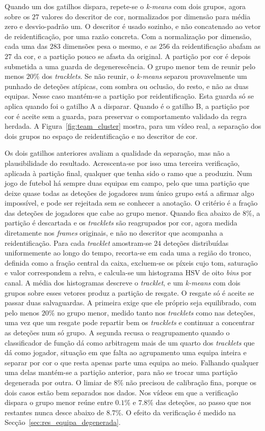 Quando um dos gatilhos dispara, repete-se o \emph{k-means} com dois grupos, agora sobre os $27$ valores do descritor de cor, normalizados por dimensão para média zero e desvio-padrão um. O descritor é usado sozinho, e não concatenado ao vetor de reidentificação, por uma razão concreta. Com a normalização por dimensão, cada uma das $283$ dimensões pesa o mesmo, e as $256$ da reidentificação abafam as $27$ da cor, e a partição pouco se afasta da original. A partição por cor é depois submetida a uma guarda de degenerescência. O grupo menor tem de reunir pelo menos $20\%$ dos \emph{tracklets}. Se não reunir, o \emph{k-means} separou provavelmente um punhado de deteções atípicas, com sombra ou oclusão, do resto, e não as duas equipas. Nesse caso mantém-se a partição por reidentificação. Esta guarda só se aplica quando foi o gatilho A a disparar. Quando é o gatilho B, a partição por cor é aceite sem a guarda, para preservar o comportamento validado da regra herdada. A Figura~\ref{fig:team_cluster} mostra, para um vídeo real, a separação dos dois grupos no espaço de reidentificação e no descritor de cor.

Os dois gatilhos anteriores avaliam a qualidade da separação, mas não a plausibilidade do resultado. Acrescenta-se por isso uma terceira verificação, aplicada à partição final, qualquer que tenha sido o ramo que a produziu. Num jogo de futebol há sempre duas equipas em campo, pelo que uma partição que deixe quase todas as deteções de jogadores num único grupo está a afirmar algo impossível, e pode ser rejeitada sem se conhecer a anotação. O critério é a fração das deteções de jogadores que cabe ao grupo menor. Quando fica abaixo de $8\%$, a partição é descartada e os \emph{tracklets} são reagrupados por cor, agora medida diretamente nos \emph{frames} originais, e não no descritor que acompanha a reidentificação. Para cada \emph{tracklet} amostram-se $24$ deteções distribuídas uniformemente ao longo do tempo, recorta-se em cada uma a região do tronco, definida como a fração central da caixa, excluem-se os píxeis cujo tom, saturação e valor correspondem a relva, e calcula-se um histograma HSV de oito \emph{bins} por canal. A média dos histogramas descreve o \emph{tracklet}, e um \emph{k-means} com dois grupos sobre esses vetores produz a partição de resgate. O resgate só é aceite se passar duas salvaguardas. A primeira exige que ele próprio seja equilibrado, com pelo menos $20\%$ no grupo menor, medido tanto nos \emph{tracklets} como nas deteções, uma vez que um resgate pode repartir bem os \emph{tracklets} e continuar a concentrar as deteções num só grupo. A segunda recusa o reagrupamento quando o classificador de função dá como arbitragem mais de um quarto dos \emph{tracklets} que dá como jogador, situação em que falta ao agrupamento uma equipa inteira e separar por cor o que resta apenas parte uma equipa ao meio. Falhando qualquer uma delas mantém-se a partição anterior, para não se trocar uma partição degenerada por outra. O limiar de $8\%$ não precisou de calibração fina, porque os dois casos estão bem separados nos dados. Nos vídeos em que a verificação dispara o grupo menor reúne entre $0.1\%$ e $7.8\%$ das deteções, ao passo que nos restantes nunca desce abaixo de $8.7\%$. O efeito da verificação é medido na Secção~\ref{sec:res_equipa_degenerada}.

